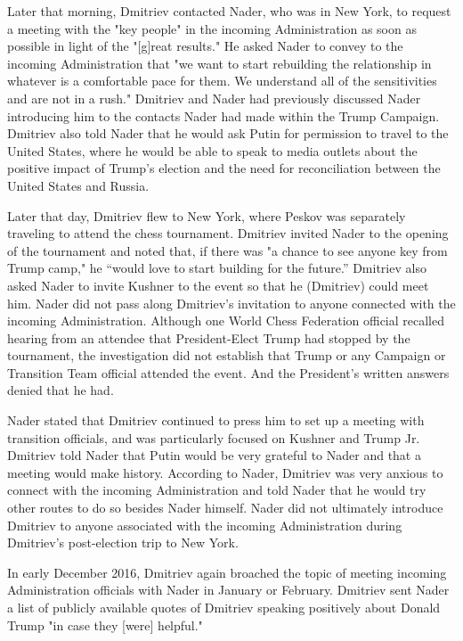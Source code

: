 Later that morning, Dmitriev contacted Nader, who was in New York, to request a meeting with the "key people" in the incoming Administration as soon as possible in light of the "[g]reat results."%
He asked Nader to convey to the incoming Administration that "we want to start rebuilding the relationship in whatever is a comfortable pace for them.
We understand all of the sensitivities and are not in a rush."%
Dmitriev and Nader had previously discussed Nader introducing him to the contacts Nader had made within the Trump Campaign.%
Dmitriev also told Nader that he would ask Putin for permission to travel to the United States, where he would be able to speak to media outlets about the positive impact of Trump's election and the need for reconciliation between the United States and Russia.%

Later that day, Dmitriev flew to New York, where Peskov was separately traveling to attend the chess tournament.%
Dmitriev invited Nader to the opening of the tournament and noted that, if there was "a chance to see anyone key from Trump camp," he ``would love to start building for the future.''%
Dmitriev also asked Nader to invite Kushner to the event so that he (Dmitriev) could meet him.%
Nader did not pass along Dmitriev's invitation to anyone connected with the incoming Administration.%
Although one World Chess Federation official recalled hearing from an attendee that President-Elect Trump had stopped by the tournament, the investigation did not establish that Trump or any Campaign or Transition Team official attended the event.%
And the President's written answers denied that he had.%

Nader stated that Dmitriev continued to press him to set up a meeting with transition officials, and was particularly focused on Kushner and Trump Jr.%
Dmitriev told Nader that Putin would be very grateful to Nader and that a meeting would make history.%
According to Nader, Dmitriev was very anxious to connect with the incoming Administration and told Nader that he would try other routes to do so besides Nader himself.%
Nader did not ultimately introduce Dmitriev to anyone associated with the incoming Administration during Dmitriev's post-election trip to New York.%

In early December 2016, Dmitriev again broached the topic of meeting incoming Administration officials with Nader in January or February.%
Dmitriev sent Nader a list of publicly available quotes of Dmitriev speaking positively about Donald Trump "in case they [were] helpful."%

